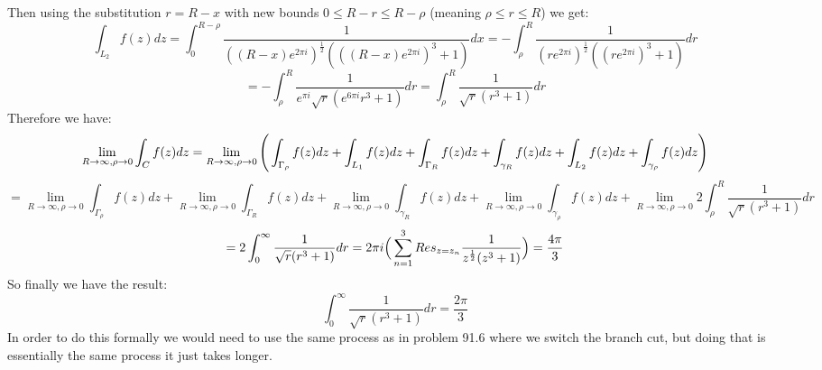 \documentclass{article}
\begin{document}
\begin{center}
    Then using the substitution $r = R - x$ with new bounds $0\leq R - r\leq R -\rho$ (meaning $\rho\leq r\leq R$) we get:
    \[\int _{L_2} f(z) dz =\int _0^{R-\rho}\frac{1}{((R-x)e^{2\pi i})^{\frac{1}{2}}(((R-x)e^{2\pi i})^3 + 1)} dx = -\int _{\rho}^R\frac{1}{(re^{2\pi i})^{\frac{1}{2}}((re^{2\pi i})^3 + 1)} dr\]
    \[= -\int _{\rho}^R\frac{1}{e^{\pi i}\sqrt{r}(e^{6\pi i}r^3 + 1)} dr =\int _{\rho}^R\frac{1}{\sqrt{r}(r^3 + 1)} dr\]
    Therefore we have:
    \[\lim _{R\rightarrow\infty,\rho\rightarrow 0}\int _C f(z) dz =\lim _{R\rightarrow\infty,\rho\rightarrow 0}\Bigg{(}\int _{\Gamma _{\rho}} f(z) dz +\int _{L_1} f(z) dz +\int _{\Gamma _R} f(z) dz +\int _{\gamma _R} f(z) dz +\int _{L_2} f(z) dz +\int _{\gamma _{\rho}} f(z) dz\Bigg{)}\]
    \[=\lim _{R\rightarrow\infty,\rho\rightarrow 0}\int _{\Gamma _{\rho}} f(z) dz +\lim _{R\rightarrow\infty,\rho\rightarrow 0}\int _{\Gamma _R} f(z) dz +\lim _{R\rightarrow\infty,\rho\rightarrow 0}\int _{\gamma _R} f(z) dz +\lim _{R\rightarrow\infty,\rho\rightarrow 0}\int _{\gamma _{\rho}} f(z) dz +\lim _{R\rightarrow\infty,\rho\rightarrow 0} 2\int _{\rho}^R\frac{1}{\sqrt{r}(r^3 + 1)} dr\]
    \[= 2\int _0^{\infty}\frac{1}{\sqrt{r}(r^3 + 1)} dr = 2\pi i\Big{(}\sum _{n=1}^3 Res_{z=z_n}\frac{1}{z^{\frac{1}{2}}(z^3 + 1)}\Big{)} =\frac{4\pi}{3}\]
    So finally we have the result:
    \[\int _0^{\infty}\frac{1}{\sqrt{r}(r^3 + 1)} dr =\frac{2\pi}{3}\]
    In order to do this formally we would need to use the same process as in problem 91.6 where we switch the branch cut, but doing that is essentially the same process it just takes longer.
\end{center}


\newpage
\end{document}
